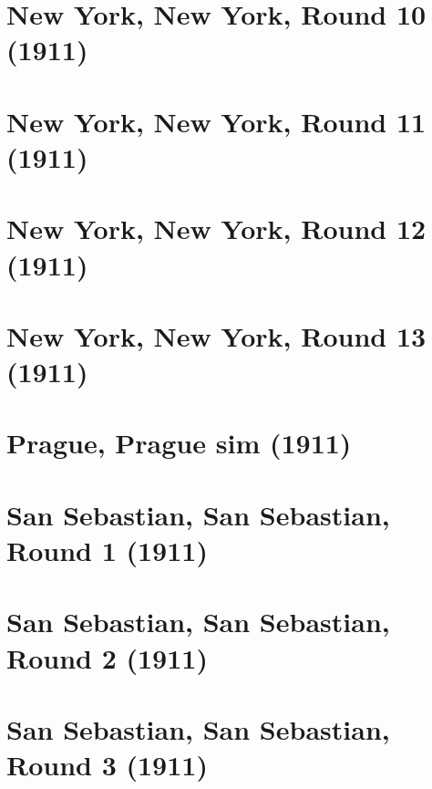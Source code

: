 \documentclass[11pt]{article}
\begin{document}
\clearpage

\section{New York, New York, Round 10 (1911)}


\clearpage

\section{New York, New York, Round 11 (1911)}


\clearpage

\section{New York, New York, Round 12 (1911)}


\clearpage

\section{New York, New York, Round 13 (1911)}


\clearpage

\section{Prague, Prague sim (1911)}


\clearpage



\clearpage



\clearpage

\section{San Sebastian, San Sebastian, Round 1 (1911)}


\clearpage

\section{San Sebastian, San Sebastian, Round 2 (1911)}


\clearpage

\section{San Sebastian, San Sebastian, Round 3 (1911)}

\end{document}
